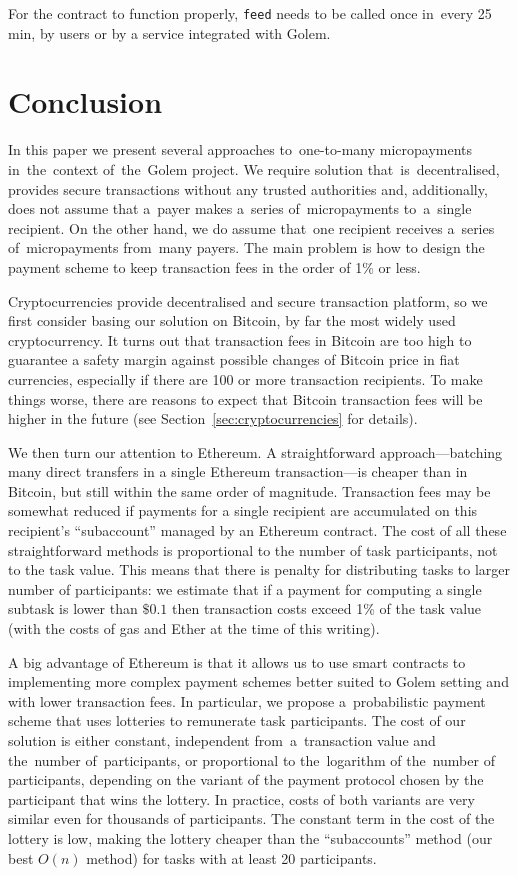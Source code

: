 \documentclass[a4paper]{article}
\begin{document}
    For the contract to function properly, \texttt{feed} needs to be called once in~every 25 min, by users or
    by a service integrated with Golem.

\section{Conclusion}
\label{sec:conclusion}    
    In this paper we present several approaches to~one-to-many micropayments in~the~context of~the~Golem
    project. We require solution that~is~decentralised, provides secure transactions without any trusted authorities
    and, additionally, does not assume that a~payer makes a~series of~micropayments to~a~single recipient.
    On the other hand, we do assume that~one recipient receives a~series of~micropayments from~many payers.
    The main problem is how to design the payment scheme to keep transaction fees in the order of 1\% or less.

    Cryptocurrencies provide decentralised and secure transaction platform, so we first consider basing our solution
    on Bitcoin, by far the most widely used cryptocurrency. It turns out that transaction fees in Bitcoin
    are too high to guarantee a safety margin against possible changes of Bitcoin price in fiat currencies, especially
    if there are 100 or more transaction recipients. To make things worse, there are reasons to expect that
    Bitcoin transaction fees will be higher in the future (see Section~\ref{sec:cryptocurrencies} for details).
    
    We then turn our attention to Ethereum. A straightforward approach---batching many direct transfers in a
    single Ethereum transaction---is cheaper than in Bitcoin, but still within the same order of magnitude.
    Transaction fees may be somewhat reduced if payments for a single recipient are accumulated on this
    recipient's ``subaccount'' managed by an Ethereum contract. The cost of all these straightforward methods
    is proportional to the number of task participants, not to the task value. This means that there is penalty
    for distributing tasks to larger number of participants: we estimate that if a payment for computing a single
    subtask is lower than $\$0.1$ then transaction costs exceed 1\% of the task value (with the costs of gas and
    Ether at the time of this writing).

    A big advantage of Ethereum is that it allows us to use smart contracts to implementing more complex
    payment schemes better suited to Golem setting and with lower transaction fees. 
    In particular, we propose a~probabilistic payment scheme that uses lotteries to remunerate task participants.
    The cost of our solution is either constant, independent from~a~transaction value and the~number of~participants,
    or proportional to the~logarithm of the~number of participants, depending on the variant of the payment protocol
    chosen by the participant that wins the lottery. In practice, costs of both variants are very similar even
    for thousands of participants. The constant term in the cost of the lottery is low, making the lottery cheaper
    than the ``subaccounts'' method (our best $O(n)$ method) for tasks with at least 20 participants.
\end{document}
